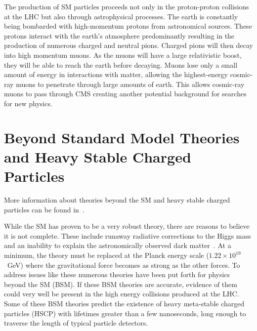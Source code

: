 The production of SM particles proceeds not only in the proton-proton collisions at the LHC but also through astrophysical processes.
The earth is constantly being bombarded with high-momentum protons from astronomical sources. These protons interact with the earth's atmosphere
predominantly resulting in the production of numerous charged and neutral pions. Charged pions will then decay into high momentum muons.
As the muons will have a large relativistic boost, they will be able to reach the earth before decaying.
Muons lose only a small amount of energy in interactions with matter,
allowing the highest-energy cosmic-ray muons to penetrate through large amounts of earth.
This allows cosmic-ray muons to pass through CMS creating another potential background for searches for new physics.

\section{Beyond Standard Model Theories and Heavy Stable Charged Particles \label{sec:BSM}}
More information about theories beyond the SM and heavy stable charged particles can be found in~\cite{Martin:1997ns, Tata:1997uf, Fairbairn:2006gg}.

While the SM has proven to be a very robust theory, there are reasons to believe it is not complete. These include runaway
radiative corrections to the Higgs mass and an inability to explain the astronomically observed dark matter~\cite{1983SciAm.248...96R}.
At a minimum, the theory must be replaced at the Planck energy scale ($1.22 \times 10^{19}$~GeV)
where the gravitational force becomes as strong as the other forces. To address issues like these numerous
theories have been put forth for physics beyond the SM (BSM). 
If these BSM theories are accurate, evidence of them could very well be present in the high energy collisions produced at the LHC.
Some of these BSM theories predict the existence of heavy meta-stable
charged particles (HSCP) with lifetimes greater than a few nanoseconds, long enough to traverse the length of typical particle detectors. 

